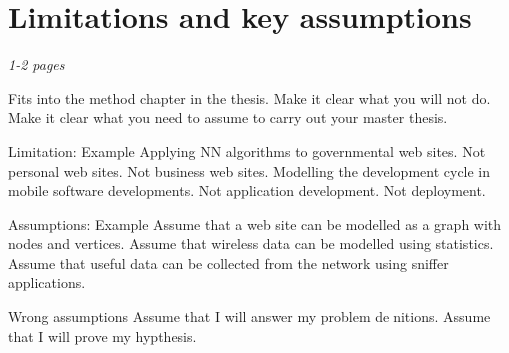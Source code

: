 \chapter{Limitations and key assumptions}
\label{ch:limitations}
\textit{1-2 pages}

Fits into the method chapter in the thesis.
Make it clear what you will not do.
Make it clear what you need to assume to carry out your
master thesis.

Limitation: Example
Applying NN algorithms to governmental web sites.
Not personal web sites.
Not business web sites.
Modelling the development cycle in mobile software developments.
Not application development.
Not deployment.

Assumptions: Example
Assume that a web site can be modelled as a graph with
nodes and vertices.
Assume that wireless data can be modelled using statistics.
Assume that useful data can be collected from the network
using sniffer applications.

Wrong assumptions
Assume that I will answer my problem denitions. 
Assume that I will prove my hypthesis.